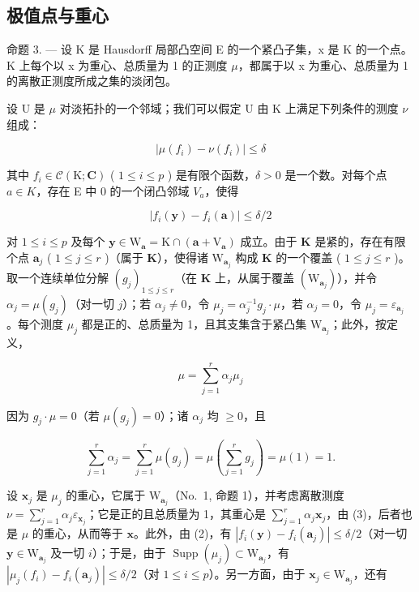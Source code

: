 \subsection{极值点与重心}

命题 3. --- 设 K 是 Hausdorff 局部凸空间 E 的一个紧凸子集，x 是 K 的一个点。K 上每个以 x 为重心、总质量为 1 的正测度 \(\mu\)，都属于以 x 为重心、总质量为 1 的离散正测度所成之集的淡闭包。

设 U 是 \(\mu\) 对淡拓扑的一个邻域；我们可以假定 U 由 K 上满足下列条件的测度 \(\nu\) 组成：

\[
\left| \mu (f _ {i}) - \nu (f _ {i}) \right| \leqslant \delta\tag{1}
\]

其中 \(f_{i} \in \mathcal{C}(\mathrm{K}; \mathbf{C})\) ( \(1 \leqslant i \leqslant p\) ) 是有限个函数，\(\delta > 0\) 是一个数。对每个点 \(a \in K\)，存在 E 中 0 的一个闭凸邻域 \(V_{a}\)，使得

\[
\left| f _ {i} (\mathbf {y}) - f _ {i} (\mathbf {a}) \right| \leqslant \delta / 2\tag{2}
\]

对 \(1 \leqslant i \leqslant p\) 及每个 \(\mathbf{y} \in \mathrm{W}_{\mathbf{a}} = \mathrm{K} \cap (\mathbf{a} + \mathrm{V}_{\mathbf{a}})\) 成立。由于 \(\mathbf{K}\) 是紧的，存在有限个点 \(\mathbf{a}_j\) ( \(1 \leqslant j \leqslant r\) )（属于 \(\mathbf{K}\)），使得诸 \(\mathrm{W}_{\mathbf{a}_j}\) 构成 \(\mathbf{K}\) 的一个覆盖 ( \(1 \leqslant j \leqslant r\) )。取一个连续单位分解 \((g_j)_{1 \leqslant j \leqslant r}\)（在 \(\mathbf{K}\) 上，从属于覆盖 \((\mathrm{W}_{\mathbf{a}_j})\)），并令 \(\alpha_j = \mu(g_j)\)（对一切 \(j\)）；若 \(\alpha_j \neq 0\)，令 \(\mu_j = \alpha_j^{-1} g_j \cdot \mu\)，若 \(\alpha_j = 0\)，令 \(\mu_j = \varepsilon_{\mathbf{a}_j}\)。每个测度 \(\mu_j\) 都是正的、总质量为 1，且其支集含于紧凸集 \(\mathrm{W}_{\mathbf{a}_j}\)；此外，按定义，

\[
\mu = \sum_ {j = 1} ^ {r} \alpha_ {j} \mu_ {j}\tag{3}
\]

因为 \(g_{j} \cdot \mu = 0\)（若 \(\mu(g_{j}) = 0\)）；诸 \(\alpha_{j}\) 均 \(\geqslant 0\)，且

\[
\sum_ {j = 1} ^ {r} \alpha_ {j} = \sum_ {j = 1} ^ {r} \mu (g _ {j}) = \mu \left(\sum_ {j = 1} ^ {r} g _ {j}\right) = \mu (1) = 1.
\]

设 \(\mathbf{x}_j\) 是 \(\mu_j\) 的重心，它属于 \(\mathrm{W}_{\mathbf{a}_j}\)（No.~1, 命题 1），并考虑离散测度 \(\nu = \sum_{j=1}^{r} \alpha_j \varepsilon_{\mathbf{x}_j}\)；它是正的且总质量为 1，其重心是 \(\sum_{j=1}^{r} \alpha_j \mathbf{x}_j\)，由 (3)，后者也是 \(\mu\) 的重心，从而等于 \(\mathbf{x}\)。此外，由 (2)，有 \(|f_i(\mathbf{y}) - f_i(\mathbf{a}_j)| \leqslant \delta/2\)（对一切 \(\mathbf{y} \in \mathrm{W}_{\mathbf{a}_j}\) 及一切 \(i\)）；于是，由于 \(\operatorname{Supp}(\mu_j) \subset \mathrm{W}_{\mathbf{a}_j}\)，有 \(|\mu_j(f_i) - f_i(\mathbf{a}_j)| \leqslant \delta/2\)（对 \(1 \leqslant i \leqslant p\)）。另一方面，由于 \(\mathbf{x}_j \in \mathrm{W}_{\mathbf{a}_j}\)，还有

